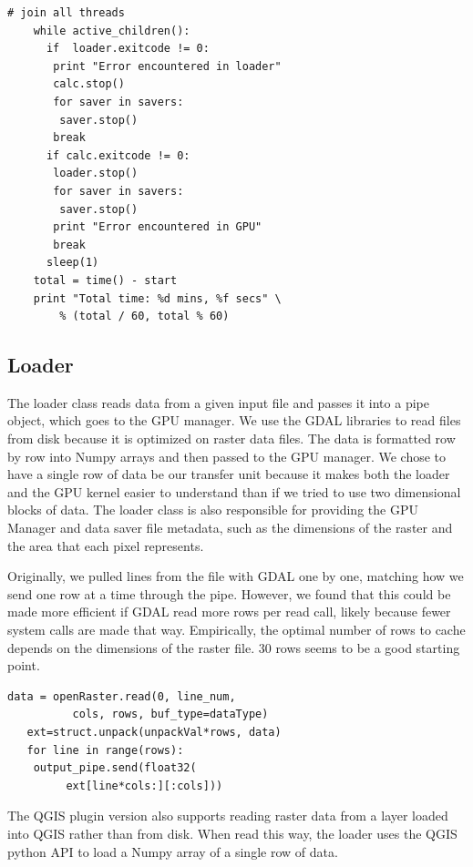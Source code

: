 \documentclass[journal]{IEEEtran}
\begin{document}
    \begin{Verbatim}[frame=single, gobble=4]
    # join all threads
    while active_children():
      if  loader.exitcode != 0:
       print "Error encountered in loader"            
       calc.stop()
       for saver in savers:
        saver.stop()
       break
      if calc.exitcode != 0:
       loader.stop()
       for saver in savers:
        saver.stop()
       print "Error encountered in GPU"
       break
      sleep(1)    
    total = time() - start
    print "Total time: %d mins, %f secs" \
        % (total / 60, total % 60)
    \end{Verbatim}
    \break

    \subsection{Loader}
    The loader class reads data from a given input file and passes it into
    a pipe object, which goes to the GPU manager. We use the GDAL libraries to
    read files from disk because it is optimized on raster data files. The data is
    formatted row by row into Numpy arrays and then passed to the GPU manager.
    We chose to have a single row of data be our transfer unit because it makes
    both the loader and the GPU kernel easier to understand than if we tried to
    use two dimensional blocks of data. The loader class is also responsible
    for providing the GPU Manager and data saver file metadata, such as the
    dimensions of the raster and the area that each pixel represents.

    Originally, we pulled lines from the file with GDAL one by one, matching
    how we send one row at a time through the pipe. However, we found that this
    could be made more efficient if GDAL read more rows per read call, likely
    because fewer system calls are made that way. Empirically, the optimal number
    of rows to cache depends on the dimensions of the raster file. 30 rows seems
    to be a good starting point.

\begin{Verbatim}[frame=single, gobble=2]
   data = openRaster.read(0, line_num, 
	      cols, rows, buf_type=dataType)
   ext=struct.unpack(unpackVal*rows, data)
   for line in range(rows):
    output_pipe.send(float32(
	     ext[line*cols:][:cols]))
\end{Verbatim}

    The QGIS plugin version also supports reading raster data from a layer loaded
    into QGIS rather than from disk. When read this way, the loader uses the QGIS
    python API to load a Numpy array of a single row of data.
\end{document}
